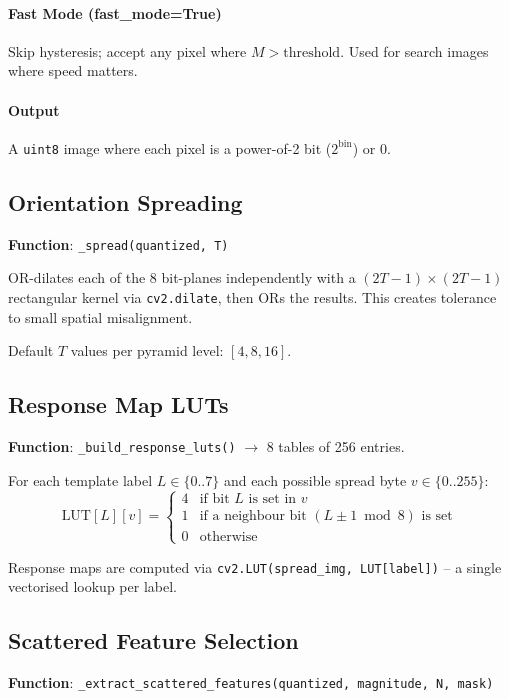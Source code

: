 \documentclass[11pt,a4paper]{article}
\begin{document}
\paragraph{Fast Mode (fast\_mode=True)}
Skip hysteresis; accept any pixel where $M > \text{threshold}$. Used for search images where speed matters.

\paragraph{Output} A \texttt{uint8} image where each pixel is a power-of-2 bit ($2^{\text{bin}}$) or 0.

\subsection{Orientation Spreading}\label{sec:spread}
\textbf{Function}: \texttt{\_spread(quantized, T)}

OR-dilates each of the 8 bit-planes independently with a $(2T{-}1) \times (2T{-}1)$ rectangular kernel via \texttt{cv2.dilate}, then ORs the results. This creates tolerance to small spatial misalignment.

Default $T$ values per pyramid level: $[4, 8, 16]$.

\subsection{Response Map LUTs}\label{sec:lut}
\textbf{Function}: \texttt{\_build\_response\_luts()} $\rightarrow$ 8 tables of 256 entries.

For each template label $L \in \{0..7\}$ and each possible spread byte $v \in \{0..255\}$:
\[
\text{LUT}[L][v] = \begin{cases}4 & \text{if bit } L \text{ is set in } v\\1 & \text{if a neighbour bit } (L\pm 1 \bmod 8) \text{ is set}\\0 & \text{otherwise}\end{cases}
\]

Response maps are computed via \texttt{cv2.LUT(spread\_img, LUT[label])} -- a single vectorised lookup per label.

\subsection{Scattered Feature Selection}\label{sec:features}
\textbf{Function}: \texttt{\_extract\_scattered\_features(quantized, magnitude, N, mask)}
\end{document}
